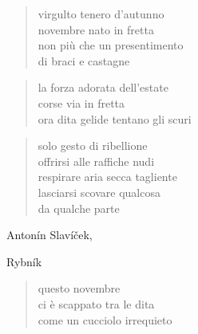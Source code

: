 \begin{volumetitlepage}
	\bigskip\bigskip\bigskip
\end{volumetitlepage}


	\begin{verse}
		virgulto tenero d’autunno\\
		novembre nato in fretta\\
		non più che un presentimento\\
		di braci e castagne
	\end{verse}

	\begin{verse}
		la forza adorata dell’estate\\
		corse via in fretta\\
		ora dita gelide tentano gli scuri
	\end{verse}

\clearpage


	\begin{verse}
		solo gesto di ribellione\\
		offrirsi alle raffiche nudi\\
		respirare aria secca tagliente\\
		lasciarsi scovare qualcosa\\
		da qualche parte
	\end{verse}

\clearpage


\begin{artItem}
	Antonín Slavíček, \begin{otherlanguage}{czech}%
		Rybník%
	\end{otherlanguage}
\end{artItem}

	\begin{verse}
		questo novembre\\
		ci è scappato tra le dita\\
		come un cucciolo irrequieto
	\end{verse}

